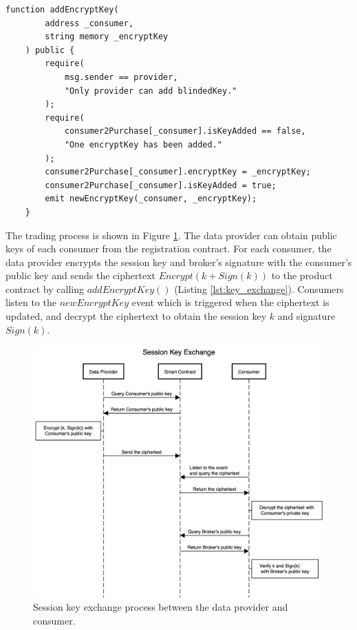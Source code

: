 \documentclass[journal,article,applsci,submit,moreauthors,pdftex]{Definitions/mdpi}
\begin{document}
\lstset{style=solidity}

\begin{lstlisting}[caption={update encrypt key}, label={lst:key_exchange}, frame=single]
    function addEncryptKey(
        address _consumer,
        string memory _encryptKey
    ) public {
        require(
            msg.sender == provider,
            "Only provider can add blindedKey."
        );
        require(
            consumer2Purchase[_consumer].isKeyAdded == false,
            "One encryptKey has been added."
        );
        consumer2Purchase[_consumer].encryptKey = _encryptKey;
        consumer2Purchase[_consumer].isKeyAdded = true;
        emit newEncryptKey(_consumer, _encryptKey);
    }
\end{lstlisting}

The trading process is shown in Figure \ref{fig:key_exchange}. The data provider can obtain public keys of each consumer from the registration contract. For each consumer, the data provider encrypts the session key and broker's signature with the consumer's public key and sends the ciphertext $Encrypt(k + Sign(k))$ to the product contract by calling $addEncryptKey()$ (Listing \ref{lst:key_exchange}). Consumers listen to the $newEncryptKey$ event which is triggered when the ciphertext is updated, and decrypt the ciphertext to obtain the session key $k$ and signature $Sign(k)$.

\begin{figure}[H]
    \centering
    \includegraphics[width=5.5 in]{key_exchange}
    \caption{Session key exchange process between the data provider and consumer.}
    \label{fig:key_exchange}
\end{figure}
\end{document}

